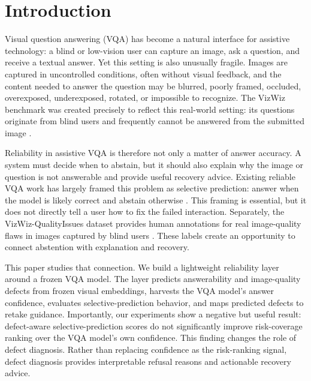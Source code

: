 \section{Introduction}

Visual question answering (VQA) has become a natural interface for assistive technology: a blind or low-vision user can capture an image, ask a question, and receive a textual answer. Yet this setting is also unusually fragile. Images are captured in uncontrolled conditions, often without visual feedback, and the content needed to answer the question may be blurred, poorly framed, occluded, overexposed, underexposed, rotated, or impossible to recognize. The VizWiz benchmark was created precisely to reflect this real-world setting: its questions originate from blind users and frequently cannot be answered from the submitted image \cite{gurari2018vizwiz}.

Reliability in assistive VQA is therefore not only a matter of answer accuracy. A system must decide when to abstain, but it should also explain why the image or question is not answerable and provide useful recovery advice. Existing reliable VQA work has largely framed this problem as selective prediction: answer when the model is likely correct and abstain otherwise \cite{whitehead2022reliable,dancette2023improving}. This framing is essential, but it does not directly tell a user how to fix the failed interaction. Separately, the VizWiz-QualityIssues dataset provides human annotations for real image-quality flaws in images captured by blind users \cite{chiu2020assessing}. These labels create an opportunity to connect abstention with explanation and recovery.

This paper studies that connection. We build a lightweight reliability layer around a frozen VQA model. The layer predicts answerability and image-quality defects from frozen visual embeddings, harvests the VQA model's answer confidence, evaluates selective-prediction behavior, and maps predicted defects to retake guidance. Importantly, our experiments show a negative but useful result: defect-aware selective-prediction scores do not significantly improve risk-coverage ranking over the VQA model's own confidence. This finding changes the role of defect diagnosis. Rather than replacing confidence as the risk-ranking signal, defect diagnosis provides interpretable refusal reasons and actionable recovery advice.

